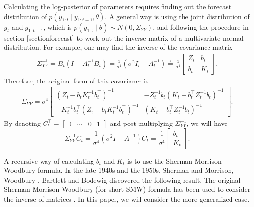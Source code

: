 Calculating the log-posterior of parameters requires finding out the forecast distribution of $p(y_{1:t}\mid y_{1:t-1},\theta)$. A general way is using the joint distribution of $y_{t}$ and $y_{1:t-1}$, which is $p(y_{1:t}\mid \theta)\sim N(0,\Sigma_{YY})$, and following the procedure in section \ref{sectionforecast} to work out the inverse matrix of a multivariate normal distribution. For example, one may find the inverse of the covariance matrix 
\begin{align*}
\Sigma_{YY}^{-1} = B_t(I-A_t^{-1}B_t) =\frac{1}{\sigma^4}(\sigma^2 I_t-A_t^{-1}) \triangleq \frac{1}{\sigma^4} \left[\begin{matrix} 
Z_{t} & b_{t} \\
b_{t}^\top & K_{t}
\end{matrix} \right].
\end{align*}
Therefore, the original form of this covariance is 
\begin{align*} \Sigma_{YY} =\sigma^4 \left[ \begin{matrix}
(Z_t-b_tK_t^{-1}b_t^\top)^{-1} & -Z_t^{-1}b_t(K_t-b_t^\top Z_t^{-1}b_t)^{-1}\\
-K_t^{-1}b_t^\top (Z_t-b_tK_t^{-1}b_t^\top)^{-1} & (K_t-b_t^\top Z_t^{-1}b_t)^{-1}
\end{matrix}\right].
\end{align*}
By denoting $C_{t}^\top = \begin{bmatrix} 0 & \cdots & 0 & 1\end{bmatrix}$ and post-multiplying $\Sigma_{YY}^{-1}$, we will have  
\begin{equation}\label{beforeSMformula}
\Sigma_{YY}^{-1} C_{t}= \frac{1}{\sigma^4}(\sigma^2 I-A^{-1}) C_{t}= \frac{1}{\sigma^4} \left[\begin{matrix} b_{t} \\ K_{t} \end{matrix} \right].
\end{equation} 


A recursive way of calculating $b_t$ and $K_t$ is to use the Sherman-Morrison-Woodbury formula. In the late 1940s and the 1950s, Sherman and Morrison\cite{sherman1950adjustment}, Woodbury \cite{woodbury1950inverting}, Bartlett \cite{bartlett1951inverse} and Bodewig \cite{bodewig1959matrix} discovered the following result. The original Sherman-Morrison-Woodbury (for short SMW) formula has been used to consider the inverse of matrices \cite{deng2011generalization}. In this paper, we will consider the more generalized case. 

